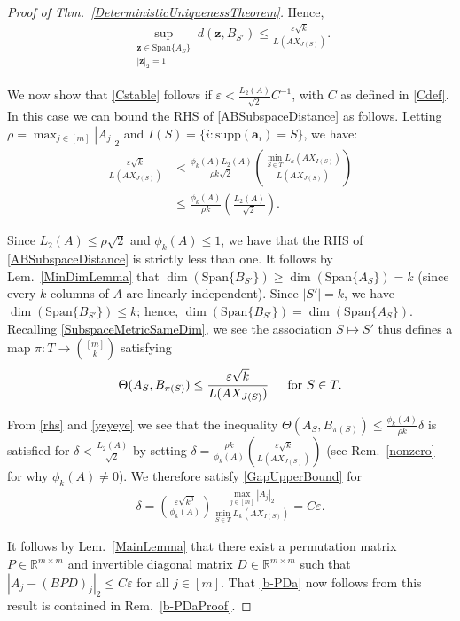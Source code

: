 \documentclass[journal, twocolumn]{IEEEtran}
\begin{document}
\begin{proof}[Proof of Thm.~\ref{DeterministicUniquenessTheorem}]
Hence,
\begin{align}\label{ABSubspaceDistance}
\sup_{ \substack{ \mathbf{z} \in \text{Span}\{A_{S}\} \\ |\mathbf{z}|_2 = 1} } d(\mathbf{z}, B_{S'}) \leq \frac{\varepsilon\sqrt{k}}{L(AX_{J(S)})}.
\end{align}

We now show that \eqref{Cstable} follows if $\varepsilon < \frac{L_2(A)}{\sqrt{2}}C^{-1}$, with $C$ as defined in \eqref{Cdef}. In this case we can bound the RHS of \eqref {ABSubspaceDistance} as follows. Letting $\rho = \max_{j \in [m]} |A_j|_2$ and $I(S) = \{i: \text{supp}(\mathbf{a}_i)=S\}$, we have:
\begin{align}\label{rhs}
\frac{\varepsilon\sqrt{k}}{L(AX_{J(S)})} 
&<  \frac{\phi_k(A) L_2(A)}{\rho k \sqrt{2}} \left( \frac{\min_{S \in T}L_k(AX_{I(S)})}{L(AX_{J(S)})} \right) \nonumber \\
&\leq \frac{\phi_k(A)}{\rho k} \left( \frac{L_2(A)}{\sqrt{2}} \right).
\end{align}

Since $L_2(A) \leq \rho \sqrt{2}$ and $\phi_k(A) \leq 1$, we have that the RHS of \eqref{ABSubspaceDistance} is strictly less than one. It follows by Lem.~\ref{MinDimLemma} that $\dim(\text{Span}\{B_{S'}\}) \geq \dim(\text{Span}\{A_{S}\}) = k$ (since every $k$ columns of $A$ are linearly independent). Since $|S'| = k$, we have $\dim(\text{Span}\{B_{S'}\}) \leq k$; hence, $\dim(\text{Span}\{B_{S'}\}) = \dim(\text{Span}\{A_{S}\})$. Recalling \eqref{SubspaceMetricSameDim},  we see the association $S \mapsto S'$ thus defines a map $\pi: T \to {[m] \choose k}$ satisfying
\begin{align}\label{yeyeye}
\Theta(A_{S}, B_{\pi(S)}) \leq \frac{\varepsilon\sqrt{k}}{L(AX_{J(S)})} \indent \text{for } S \in T.
\end{align}

From \eqref{rhs} and \eqref{yeyeye} we see that the inequality $\Theta(A_{S}, B_{\pi(S)}) \leq \frac{ \phi_k(A) }{\rho k} \delta$ is satisfied for $\delta < \frac{L_2(A)}{\sqrt{2}}$ by setting $\delta = \frac{ \rho k}{ \phi_k(A) } \left(  \frac{\varepsilon \sqrt{k}}{L(AX_{J(S)})} \right)$ (see Rem.~\ref{nonzero} for why $\phi_k(A) \neq 0$). We therefore satisfy \eqref{GapUpperBound} for 
\begin{align*}
\delta = \left( \frac{ \varepsilon \sqrt{k^3}}{ \phi_k(A) } \right) \frac{\max_{j \in [m]} |A_j|_2}{\min_{S \in T} L_k(AX_{I(S)})}
= C\varepsilon.
\end{align*}

It follows by Lem.~\ref{MainLemma} that there exist a permutation matrix $P \in \mathbb{R}^{m \times m}$ and invertible diagonal matrix $D \in \mathbb{R}^{m \times m}$ such that $|A_j - (BPD)_j|_2 \leq C\varepsilon$ for all $j \in [m]$. That \eqref{b-PDa} now follows from this result is contained in Rem.~\ref{b-PDaProof}.
\end{proof}
\end{document}
